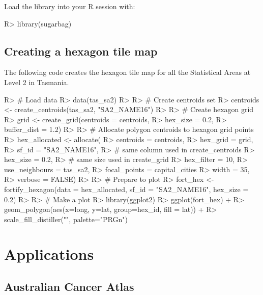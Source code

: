 \documentclass[
]{jss}
\begin{document}
Load the library into your R session with:

\begin{CodeChunk}

\begin{CodeInput}
R> library(sugarbag)
\end{CodeInput}
\end{CodeChunk}

\hypertarget{creating-a-hexagon-tile-map}{%
\subsection{Creating a hexagon tile
map}\label{creating-a-hexagon-tile-map}}

The following code creates the hexagon tile map for all the Statistical
Areas at Level 2 in Tasmania.

\begin{CodeChunk}

\begin{CodeInput}
R> # Load data
R> data(tas_sa2)
R> 
R> # Create centroids set
R> centroids <- create_centroids(tas_sa2, "SA2_NAME16")
R> 
R> # Create hexagon grid
R> grid <- create_grid(centroids = centroids,
R>     hex_size = 0.2,
R>     buffer_dist = 1.2)
R> 
R> # Allocate polygon centroids to hexagon grid points
R> hex_allocated <- allocate(
R>   centroids = centroids,
R>   hex_grid = grid,
R>   sf_id = "SA2_NAME16",
R>   # same column used in create_centroids
R>   hex_size = 0.2,
R>   # same size used in create_grid
R>   hex_filter = 10,
R>   use_neighbours = tas_sa2,
R>   focal_points = capital_cities %
R>   width = 35,
R>   verbose = FALSE)
R> 
R> # Prepare to plot
R> fort_hex <- fortify_hexagon(data = hex_allocated, sf_id = "SA2_NAME16", hex_size = 0.2)
R> 
R> # Make a plot
R> library(ggplot2)
R> ggplot(fort_hex) + 
R>   geom_polygon(aes(x=long, y=lat, group=hex_id, fill = lat)) +
R>   scale_fill_distiller("", palette="PRGn")
\end{CodeInput}
\end{CodeChunk}

\hypertarget{applications}{%
\section{Applications}\label{applications}}

\hypertarget{australian-cancer-atlas}{%
\subsection{Australian Cancer Atlas}\label{australian-cancer-atlas}}
\end{document}
